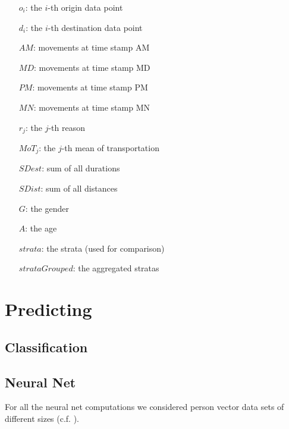 \documentclass[runningheads]{llncs}
\begin{document}
	\begin{multicols}{2}
		\begin{itemize}
			\setlength{\itemindent}{.4cm}
			\item[$o_i$:]  the $i$-th origin data point
			\item[$d_i$:]  the $i$-th destination data point
			\item[$\mathit{AM}$:] movements at time stamp AM
			\item[$\mathit{MD}$:] movements at time stamp MD
			\item[$\mathit{PM}$:] movements at time stamp PM
			\item[$\mathit{MN}$:] movements at time stamp MN
			\item[$r_j$:] the $j$-th reason
			\item[$\mathit{MoT}_j$:] the $j$-th mean of transportation
			\item[$\mathit{SDest}$:] sum of all durations
			\item[$\mathit{SDist}$:] sum of all distances
			\item[$\mathit{G}$:] the gender
			\item[$\mathit{A}$:] the age
			\item[$strata$:] the strata (used for comparison)
			\item[$strataGrouped$:] the aggregated stratas
		\end{itemize}
	\end{multicols}
	\section{Predicting}
	
	\subsection{Classification}
	
	\subsection{Neural Net}
	For all the neural net computations we considered person vector data sets of different sizes (c.f. ).\\
	
\end{document}
